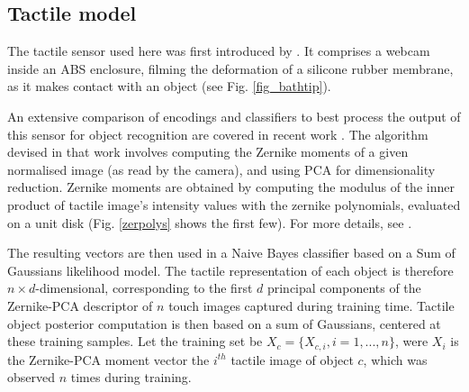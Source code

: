 \documentclass[letterpaper, 10 pt, conference]{ieeeconf}  %
\begin{document}
\subsection{Tactile model}
The tactile sensor used here was first introduced by \cite{Corradi2014}. It comprises a webcam inside an ABS enclosure, filming the deformation of a silicone rubber membrane, as it makes contact with an object (see Fig. \ref{fig_bathtip}). 
\begin{figure}
\centering
{}
\end{figure}
An extensive comparison of encodings and classifiers to best process the output of this sensor for object recognition are covered in recent work \cite{Corradi2014,Corradi2015}. The algorithm devised in that work involves computing the Zernike moments \cite{Zernike1934} of a given normalised image (as read by the camera), and using PCA for dimensionality reduction. Zernike moments are obtained by computing the modulus of the inner product of tactile image's intensity values with the zernike polynomials, evaluated on a unit disk (Fig. \ref{zerpolys} shows the first few). For more details, see \cite{Corradi2015}.
\begin{figure}
	\centering
	\end{figure}
	
The resulting vectors are then used in a Naive Bayes classifier based on a Sum of Gaussians likelihood model. The tactile representation of each object is therefore $n \times d$-dimensional, corresponding to the first $d$ principal components of the Zernike-PCA descriptor of $n$ touch images captured during training time.
Tactile object posterior computation is then based on a sum of Gaussians, centered at these training samples. Let the training set be $X_c = \{X_{c,i}, i=1,...,n\}$, were $X_i$ is the Zernike-PCA moment vector the $i^{th}$ tactile image of object $c$, which was observed $n$ times during training. 
\end{document}
